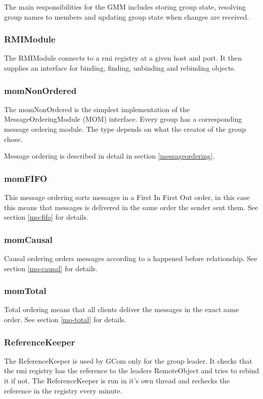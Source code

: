 \documentclass[english]{article}
\begin{document}
The main responsibilities for the GMM includes storing group state, resolving group names to members and updating group state when changes are received.

\subsubsection{RMIModule}
The RMIModule connects to a rmi registry at a given host and port. It then supplies an interface for binding, finding, unbinding and rebinding objects.

\subsubsection{momNonOrdered}
The momNonOrdered is the simplest implementation of the MessageOrderingModule (MOM) interface. Every group has a corresponding message ordering module. The type depends on what the creator of the group chose. 

Message ordering is described in detail in section \vref{messageordering}.

\subsubsection{momFIFO}
This message ordering sorts messages in a First In First Out order, in this case this means that messages is delivered in the same order the sender sent them. See section \vref{mo-fifo} for details.

\subsubsection{momCausal}
Causal ordering orders messages according to a happened before relationship. See section \vref{mo-causal} for details.

\subsubsection{momTotal}
Total ordering means that all clients deliver the messages in the exact same order. See section \vref{mo-total} for details.

\subsubsection{ReferenceKeeper}
The ReferenceKeeper is used by GCom only for the group leader. It checks that the rmi registry has the reference to the leaders RemoteObject and tries to rebind it if not. The ReferenceKeeper is run in it's own thread and rechecks the reference in the registry every minute.
\end{document}
